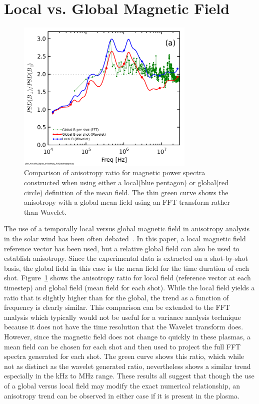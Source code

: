 \documentclass[aip,prl,amsmath,amssymb,reprint,superscriptaddress]{revtex4-1} %
\begin{document}
\section{Local vs. Global Magnetic Field}\label{sec:LocGlobe}

\begin{figure}[!htbp]
\centerline{
\includegraphics[width=8.5cm]{BperpparaGlobalBcomp_chan1t4_1mWbspectra}}
\caption{\label{fig:globalcomparison} Comparison of anisotropy ratio for magnetic power spectra constructed when using either a local(blue pentagon) or global(red circle) definition of the mean field. The thin green curve shows the anisotropy with a global mean field using an FFT transform rather than Wavelet.}
\end{figure}

The use of a temporally local versus global magnetic field in anisotropy analysis in the solar wind has been often debated~\cite{podesta09,matthaeus12}. In this paper, a local magnetic field reference vector has been used, but a relative global field can also be used to establish anisotropy. Since the experimental data is extracted on a shot-by-shot basis, the global field in this case is the mean field for the time duration of each shot. Figure~\ref{fig:globalcomparison} shows the anisotropy ratio for local field (reference vector at each timestep) and global field (mean field for each shot). While the local field yields a ratio that is slightly higher than for the global, the trend as a function of frequency is clearly similar. This comparison can be extended to the FFT analysis which typically would not be useful for a variance analysis technique because it does not have the time resolution that the Wavelet transform does. However, since the magnetic field does not change to quickly in these plasmas, a mean field can be chosen for each shot and then used to project the full FFT spectra generated for each shot. The green curve shows this ratio, which while not as distinct as the wavelet generated ratio, nevertheless shows a similar trend especially in the kHz to MHz range. These results all suggest that though the use of a global versus local field may modify the exact numerical relationship, an anisotropy trend can be observed in either case if it is present in the plasma.
\end{document}
